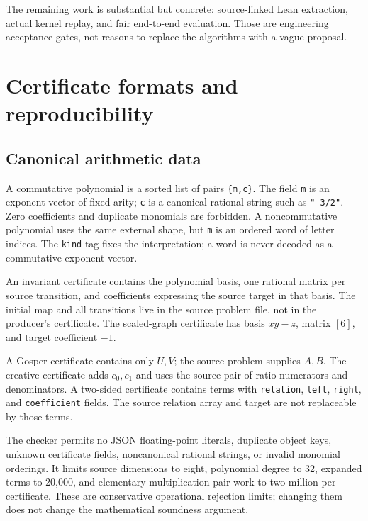 \documentclass[11pt,letterpaper]{article}
\newcommand{\code}[1]{\texttt{#1}}
\theoremstyle{definition}\newtheorem{definition}[theorem]{Definition}
\theoremstyle{remark}\newtheorem{remark}[theorem]{Remark}
\begin{document}
The remaining work is substantial but concrete: source-linked Lean extraction,
actual kernel replay, and fair end-to-end evaluation. Those are engineering
acceptance gates, not reasons to replace the algorithms with a vague proposal.

\appendix
\section{Certificate formats and reproducibility}
\label{app:formats}

\subsection{Canonical arithmetic data}
A commutative polynomial is a sorted list of pairs \code{\{m,c\}}. The field
\code{m} is an exponent vector of fixed arity; \code{c} is a canonical rational
string such as \code{"-3/2"}. Zero coefficients and duplicate monomials are
forbidden. A noncommutative polynomial uses the same external shape, but
\code{m} is an ordered word of letter indices. The \code{kind} tag fixes the
interpretation; a word is never decoded as a commutative exponent vector.

An invariant certificate contains the polynomial basis, one rational matrix per
source transition, and coefficients expressing the source target in that
basis. The initial map and all transitions live in the source problem file,
not in the producer's certificate. The scaled-graph certificate has basis
$xy-z$, matrix $[6]$, and target coefficient $-1$.

A Gosper certificate contains only $U,V$; the source problem supplies $A,B$.
The creative certificate adds $c_0,c_1$ and uses the source pair of ratio
numerators and denominators. A two-sided certificate contains terms with
\code{relation}, \code{left}, \code{right}, and \code{coefficient} fields.
The source relation array and target are not replaceable by those terms.

The checker permits no JSON floating-point literals, duplicate object keys,
unknown certificate fields, noncanonical rational strings, or invalid
monomial orderings. It limits source dimensions to eight, polynomial degree
to 32, expanded terms to 20,000, and elementary multiplication-pair work to
two million per certificate. These are conservative operational rejection
limits; changing them does not change the mathematical soundness argument.
\end{document}
